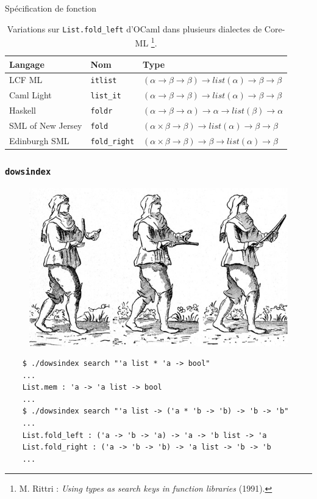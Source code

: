 \documentclass[serif]{beamer}
\newcommand{\dowsindex}{\texttt{dowsindex}\xspace}
\begin{document}
\begin{frame}{Spécification de fonction}
\footnotesize
\begin{table}[h]
 	\centering
 	\begin{tabular}{|l|l|l|}
	 	\hline
	 		Langage &
			Nom &
			Type
		\\
		\hline
			LCF ML &
			\texttt{itlist} &
			$(\alpha \rightarrow \beta \rightarrow \beta) \rightarrow list (\alpha) \rightarrow \beta \rightarrow \beta$
		\\
			Caml Light &
			\texttt{list\_it} &
			$(\alpha \rightarrow \beta \rightarrow \beta) \rightarrow list (\alpha) \rightarrow \beta \rightarrow \beta$
		\\
			Haskell &
			\texttt{foldr} &
			$(\alpha \rightarrow \beta \rightarrow \alpha) \rightarrow \alpha \rightarrow list (\beta) \rightarrow \alpha$
		\\
			SML of New Jersey &
			\texttt{fold} &
			$(\alpha \times \beta \rightarrow \beta) \rightarrow list (\alpha) \rightarrow \beta \rightarrow \beta$
		\\
			Edinburgh SML &
			\texttt{fold\_right} &
			$(\alpha \times \beta \rightarrow \beta) \rightarrow \beta \rightarrow list (\alpha) \rightarrow \beta$
		\\
		\hline
	\end{tabular}
	\caption*{Variations sur \texttt{List.fold\_left} d'OCaml dans plusieurs dialectes de Core-ML \footnote{M. Rittri : \textit{Using types as search keys in function libraries} (1991).}.}
\end{table}
\end{frame}


\begin{frame}[fragile=singleslide]\frametitle{\dowsindex}
\begin{figure}[h]
 	\centering
 	\includegraphics{images/sourcier}
\end{figure}
\footnotesize
\begin{verbatim}
	$ ./dowsindex search "'a list * 'a -> bool"
	...
	List.mem : 'a -> 'a list -> bool
	...
	$ ./dowsindex search "'a list -> ('a * 'b -> 'b) -> 'b -> 'b"
	...
	List.fold_left : ('a -> 'b -> 'a) -> 'a -> 'b list -> 'a
	List.fold_right : ('a -> 'b -> 'b) -> 'a list -> 'b -> 'b
	...
\end{verbatim}
\end{frame}
\end{document}
